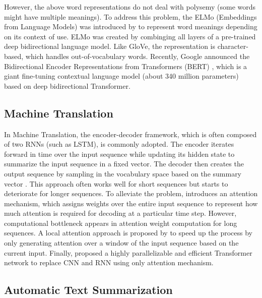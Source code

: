 However, the above word representations do not deal with polysemy (some words might have multiple meanings). To address this problem, the ELMo (Embeddings from Language Models) was introduced by \cite{peters2018deep} to represent word meanings depending on its context of use. ELMo was created by combinging all layers of a pre-trained deep bidirectional language model. Like GloVe, the representation is character-based, which handles out-of-vocabulary words. Recently, Google announced the Bidirectional Encoder Representations from Transformers (BERT) \cite{devlin2018bert}, which is a giant fine-tuning contextual language model (about 340 million parameters) based on deep bidirectional Transformer.  

\subsection{Machine Translation}
In Machine Translation, the encoder-decoder framework, which is often composed of two RNNs (such as LSTM), is commonly adopted. The encoder iterates forward in time over the input sequence while updating its hidden state to summarize the input sequence in a fixed vector. The decoder then creates the output sequence by sampling in the vocabulary space based on the summary vector \cite{sutskever2014sequence,cho2014learning}. This approach often works well for short sequences but starts to deteriorate for longer sequences. To alleviate the problem, \cite{bahdanau2014neural} introduces an attention mechanism, which assigns weights over the entire input sequence to represent how much attention is required for decoding at a particular time step. However, computational bottleneck appears in attention weight computation for long sequences. A local attention approach is proposed by \cite{luong2015effective} to speed up the process by only generating attention over a window of the input sequence based on the current input. Finally, \cite{vaswani2017attention} proposed a highly parallelizable and efficient Transformer network to replace CNN and RNN using only attention mechanism.

\subsection{Automatic Text Summarization}

